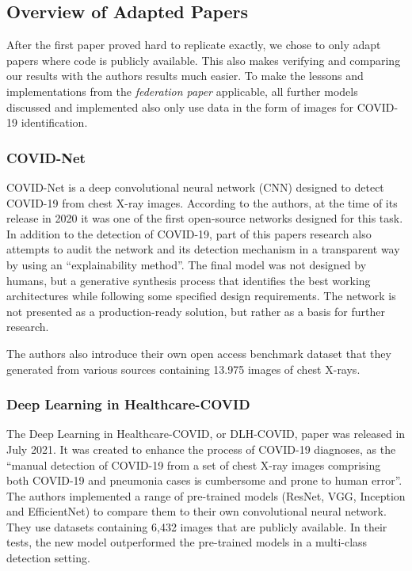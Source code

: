 \newpage
\subsection{Overview of Adapted Papers}\label{subsec:methods_adapted_papers}
After the first paper proved hard to replicate exactly, we chose to only adapt papers where code is publicly available. This also makes verifying and comparing our results with the authors results much easier.
To make the lessons and implementations from the \textit{federation paper} applicable, all further models discussed and implemented also only use data in the form of images for COVID-19 identification.

\subsubsection{COVID-Net}
COVID-Net\cite{covid_net} is a deep convolutional neural network (CNN) designed to detect COVID-19 from chest X-ray images. According to the authors, at the time of its release in 2020 it was one of the first open-source networks designed for this task. In addition to the detection of COVID-19, part of this papers research also attempts to audit the network and its detection mechanism in a transparent way by using an \enquote{explainability method}\cite{covid_net}. The final model was not designed by humans, but a generative synthesis process that identifies the best working architectures while following some specified design requirements. 
The network is not presented as a production-ready solution, but rather as a basis for further research.

The authors also introduce their own open access benchmark dataset that they generated from various sources containing 13.975 images of chest X-rays.

\subsubsection{Deep Learning in Healthcare-COVID}
The Deep Learning in Healthcare-COVID, or DLH-COVID, paper was released in July 2021. It was created to enhance the process of COVID-19 diagnoses, as the \enquote{manual detection of COVID-19 from a set of chest X-ray images comprising both COVID-19 and pneumonia cases is cumbersome and prone to human error}\cite{dlh_net}. The authors implemented a range of pre-trained models (ResNet, VGG, Inception and EfficientNet) to compare them to their own convolutional neural network. They use datasets containing 6,432 images that are publicly available. In their tests, the new model outperformed the pre-trained models in a multi-class detection setting.

